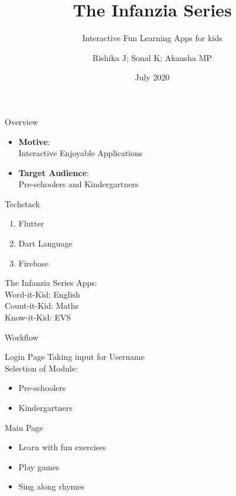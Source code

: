 \documentclass[14pt]{beamer}
\title[SlideSpeak]{The Infanzia Series}
\subtitle{Interactive Fun Learning Apps for kids}
\author[Team 16]{Rishika J; Sonal K; Akansha MP}
\date{July 2020}
\begin{document}
\begin{frame}
    \titlepage
\end{frame}

\begin{frame}{Overview}
    \pause
    \begin{itemize}
    \item \textbf{Motive}: \\
            Interactive Enjoyable Applications
        \pause
    \item \textbf{Target Audience}: \\
            Pre-schoolers and Kindergartners
    \end{itemize}
\end{frame}

\begin{frame}{Techstack}
    \pause
    \begin{enumerate}
        \item Flutter
        \item Dart Language
        \item Firebase  
    \end{enumerate}
\end{frame}

\begin{frame}
    The Infanzia Series Apps: \\ 
    \pause
    \alert{Word-it-Kid: English} \\
    \pause
    \alert{Count-it-Kid: Maths} \\
    \pause
    \alert{Know-it-Kid: EVS} 
\end{frame}

\begin{frame}[standout]
    \alert{Workflow}
\end{frame}

\begin{frame}{Login Page}
    Taking input for Username \\
    \pause
    Selection of Module: \\
    \begin{itemize}
        \item Pre-schoolers
        \item Kindergartners
    \end{itemize}
\end{frame}

\begin{frame}{Main Page}
    \begin{itemize}
        \item Learn with fun exercises \\
            \pause
        \item Play games \\
            \pause
        \item Sing along rhymes
    \end{itemize}
\end{frame}
\end{document}
